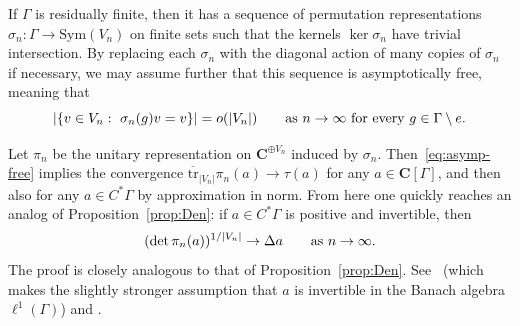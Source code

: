 \documentclass[12pt,a4paper]{article}
\numberwithin{equation}{section}
\theoremstyle{remark}
\renewcommand{\rm}[1]{\mathrm{#1}}
\newcommand{\bbC}{\mathbf{C}}
\newcommand{\G}{\Gamma}
\newcommand{\s}{\sigma}
\newcommand{\tr}{\overline{\mathrm{tr}}}
\begin{document}
If $\G$ is residually finite, then it has a sequence of permutation representations $\s_n:\G \to \rm{Sym}(V_n)$ on finite sets such that the kernels $\ker \s_n$ have trivial intersection.  By replacing each $\s_n$ with the diagonal action of many copies of $\s_n$ if necessary, we may assume further that this sequence is asymptotically free, meaning that
\begin{equation}\label{eq:asymp-free}
|\{v\in V_n:\ \s_n(g)v = v\}| = o(|V_n|) \qquad \hbox{as}\ n\to\infty\ \hbox{for every}\ g \in \G\setminus e.
\end{equation}

Let $\pi_n$ be the unitary representation on $\bbC^{\oplus V_n}$ induced by $\s_n$.  Then~\eqref{eq:asymp-free} implies the convergence $\tr_{|V_n|} \pi_n(a) \to \tau(a)$ for any $a \in \bbC[\G]$, and then also for any $a \in C^\ast \G$ by approximation in norm.  From here one quickly reaches an analog of Proposition~\ref{prop:Den}: if $a \in C^\ast \G$ is positive and invertible, then
\begin{equation}\label{eq:asymp-free-det}
(\det \pi_n(a))^{1/|V_n|} \to \Delta a \qquad \hbox{as}\ n\to\infty.
\end{equation}
The proof is closely analogous to that of Proposition~\ref{prop:Den}.  See~\cite[Thm. 6.1]{DenSch07} (which makes the slightly stronger assumption that $a$ is invertible in the Banach algebra $\ell^1(\G)$) and \cite[Lem. 7.2 and Thm. 7.3]{KerLi11b}.
\end{document}
